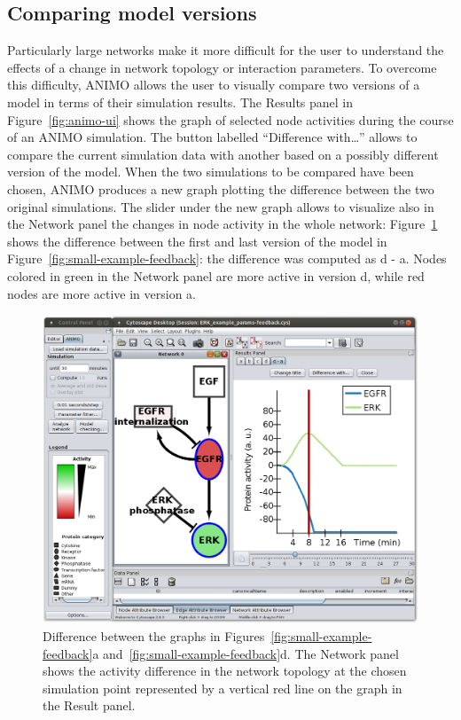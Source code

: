 \documentclass[submission,copyright,creativecommons]{eptcs}
\begin{document}
\subsection{Comparing model versions}\label{sec:comparing-versions}
Particularly large networks make it more difficult for the user to understand the effects
of a change in network topology or interaction parameters. To overcome this difficulty, ANIMO
allows the user to visually compare two versions of a model in terms of their simulation results.
The Results panel in Figure~\ref{fig:animo-ui} shows the graph of selected node activities during
the course of an ANIMO simulation. The button labelled ``Difference with\dots'' allows to compare the current
simulation data with another based on a possibly different version of the model. When the two
simulations to be compared have been chosen, ANIMO produces a new graph plotting the difference
between the two original simulations. The slider under the new graph allows to visualize also
in the Network panel the changes in node activity in the whole network: Figure~\ref{fig:diff}
shows the difference between the first and last version of the model in Figure~\ref{fig:small-example-feedback}:
the difference was computed as {\sf d - a}. Nodes colored in green in the Network panel are
more active in version {\sf d}, while red nodes are more active in version {\sf a}.

\begin{figure}
\centering
\includegraphics[width=.65\textwidth]{images/difference_network_d-a_larger}
\caption{Difference between the graphs in Figures~\ref{fig:small-example-feedback}{\sf a}
and~\ref{fig:small-example-feedback}{\sf d}. The Network panel shows the activity difference
in the network topology at the chosen simulation point represented by a vertical red line on the graph
in the Result panel.\label{fig:diff}}
\end{figure}
\end{document}

